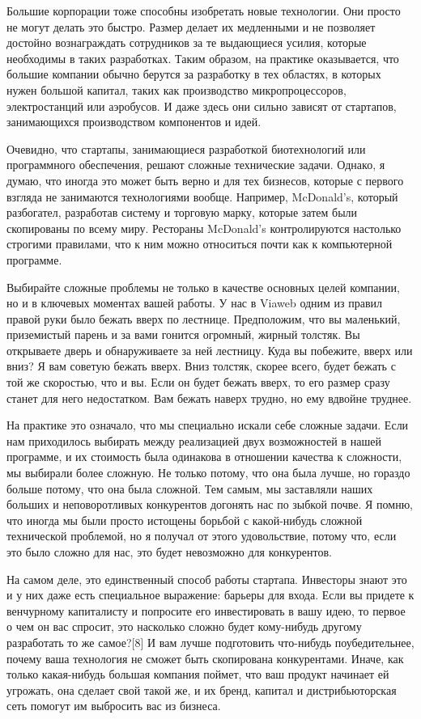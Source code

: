 \documentclass[ebook,12pt,oneside,openany]{memoir}
\begin{document}
Большие корпорации тоже способны изобретать новые технологии. Они
просто не могут делать это быстро. Размер делает их медленными и не
позволяет достойно вознаграждать сотрудников за те выдающиеся усилия,
которые необходимы в таких разработках. Таким образом, на практике
оказывается, что большие компании обычно берутся за разработку в тех
областях, в которых нужен большой капитал, таких как производство
микропроцессоров, электростанций или аэробусов. И даже здесь они
сильно зависят от стартапов, занимающихся производством компонентов и
идей.

Очевидно, что стартапы, занимающиеся разработкой биотехнологий или
программного обеспечения, решают сложные технические задачи. Однако, я
думаю, что иногда это может быть верно и для тех бизнесов, которые с
первого взгляда не занимаются технологиями вообще. Например,
McDonald’s, который разбогател, разработав систему и торговую марку,
которые затем были скопированы по всему миру. Рестораны McDonald’s
контролируются настолько строгими правилами, что к ним можно
относиться почти как к компьютерной программе.

Выбирайте сложные проблемы не только в качестве основных целей
компании, но и в ключевых моментах вашей работы. У нас в Viaweb одним
из правил правой руки было бежать вверх по лестнице. Предположим, что
вы маленький, приземистый парень и за вами гонится огромный, жирный
толстяк. Вы открываете дверь и обнаруживаете за ней лестницу. Куда вы
побежите, вверх или вниз? Я вам советую бежать вверх. Вниз толстяк,
скорее всего, будет бежать с той же скоростью, что и вы. Если он будет
бежать вверх, то его размер сразу станет для него недостатком. Вам
бежать наверх трудно, но ему вдвойне труднее.

На практике это означало, что мы специально искали себе сложные
задачи. Если нам приходилось выбирать между реализацией двух
возможностей в нашей программе, и их стоимость была одинакова в
отношении качества к сложности, мы выбирали более сложную. Не только
потому, что она была лучше, но гораздо больше потому, что она была
сложной. Тем самым, мы заставляли наших больших и неповоротливых
конкурентов догонять нас по зыбкой почве. Я помню, что иногда мы были
просто истощены борьбой с какой-нибудь сложной технической проблемой,
но я получал от этого удовольствие, потому что, если это было сложно
для нас, это будет невозможно для конкурентов.

На самом деле, это единственный способ работы стартапа. Инвесторы
знают это и у них даже есть специальное выражение: барьеры для входа.
Если вы придете к венчурному капиталисту и попросите его инвестировать
в вашу идею, то первое о чем он вас спросит, это насколько сложно
будет кому-нибудь другому разработать то же самое?[8] И вам лучше
подготовить что-нибудь поубедительнее, почему ваша технология не
сможет быть скопирована конкурентами. Иначе, как только какая-нибудь
большая компания поймет, что ваш продукт начинает ей угрожать, она
сделает свой такой же, и их бренд, капитал и дистрибьюторская сеть
помогут им выбросить вас из бизнеса.
\end{document}
